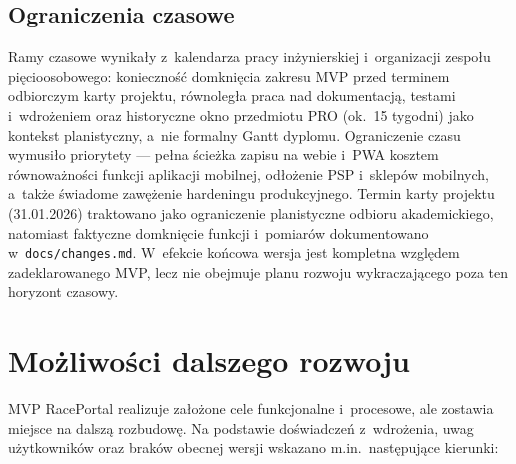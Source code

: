 \documentclass{sprz}
\begin{document}
\subsection{Ograniczenia czasowe}
Ramy czasowe wynikały z~kalendarza pracy inżynierskiej i~organizacji zespołu pięcioosobowego: konieczność domknięcia zakresu MVP przed terminem odbiorczym karty projektu, równoległa praca nad dokumentacją, testami i~wdrożeniem oraz historyczne okno przedmiotu PRO (ok.\ 15 tygodni) jako kontekst planistyczny, a~nie formalny Gantt dyplomu. Ograniczenie czasu wymusiło priorytety --- pełna ścieżka zapisu na webie i~PWA kosztem równoważności funkcji aplikacji mobilnej, odłożenie PSP i~sklepów mobilnych, a~także świadome zawężenie hardeningu produkcyjnego. Termin karty projektu (31.01.2026) traktowano jako ograniczenie planistyczne odbioru akademickiego, natomiast faktyczne domknięcie funkcji i~pomiarów dokumentowano w~\texttt{docs/\allowbreak changes.md}. W~efekcie końcowa wersja jest kompletna względem zadeklarowanego MVP, lecz nie obejmuje planu rozwoju wykraczającego poza ten horyzont czasowy.

\section{Możliwości dalszego rozwoju}
MVP RacePortal realizuje założone cele funkcjonalne i~procesowe, ale zostawia miejsce na dalszą rozbudowę. Na podstawie doświadczeń z~wdrożenia, uwag użytkowników oraz braków obecnej wersji wskazano m.in.\ następujące kierunki:
\end{document}

